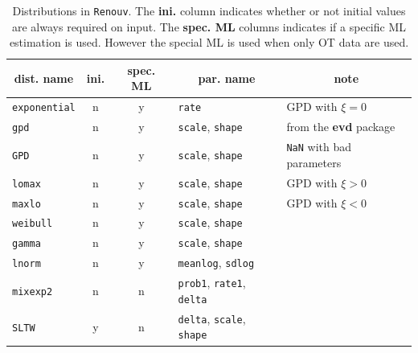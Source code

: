 \documentclass[a4paper]{report}
\begin{document}
\begin{table}
  \centering
  \begin{tabular}{l c c l l}
    \toprule
    \multicolumn{1}{c}{\textbf{dist. name}} &
    \multicolumn{1}{c}{\textbf{ini.}} &
    \multicolumn{1}{c}{\textbf{spec. ML}} &
    \multicolumn{1}{c}{\textbf{par. name}} &
     \multicolumn{1}{c}{\textbf{note}} \\  \toprule
    \texttt{exponential} & n & y
    & 
    \texttt{rate} &  GPD with $\xi = 0$ \\
    \texttt{gpd} & n & y
    & \texttt{scale}, \texttt{shape} & 
    from the \textbf{evd} package
    \\
    \texttt{GPD} & n & y
    &
    \texttt{scale}, \texttt{shape} & 
    \texttt{NaN} with bad  parameters \\
    \texttt{lomax} & n & y
    & 
    \texttt{scale}, \texttt{shape} & 
    GPD with $\xi > 0$ \\      
    \texttt{maxlo} & n & y
    & 
    \texttt{scale}, \texttt{shape} & 
    GPD with $\xi < 0$  \\ \midrule
    \texttt{weibull} & n  & y
    &
    \texttt{scale}, \texttt{shape} & 
    \\   
    \texttt{gamma} & n & y
    & \texttt{scale}, \texttt{shape} &
    \\      
    \texttt{lnorm} & n & y
    & \texttt{meanlog}, \texttt{sdlog} & 
    \\ 
    \texttt{mixexp2} & n & n
    &
    \texttt{prob1}, \texttt{rate1}, \texttt{delta} & 
    \\ %
    \texttt{SLTW} & y & n
    & 
    \texttt{delta}, \texttt{scale}, \texttt{shape} & 
    \\
    \toprule
  \end{tabular}
  \caption{
    Distributions in \texttt{Renouv}. The \textbf{ini.} column
    indicates whether or not initial values are always required on input. 
    The \textbf{spec. ML}
    columns indicates if a specific ML estimation is used. However the
    special ML is used when only OT data are used.  
  }
\end{table}
\end{document}
